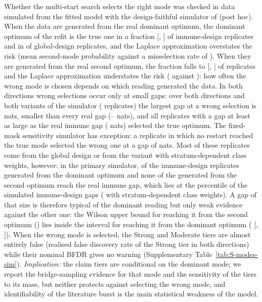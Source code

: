 Whether the multi-start search selects the right mode was checked in data simulated from the fitted model with the design-faithful simulator of  (post hoc).
When the data are generated from the real dominant optimum, the dominant optimum of the refit is the true one in a fraction \nSimPdomImm{} [\nSimPdomImmLo{}, \nSimPdomImmHi{}] of \nSimNImm{} immune-design replicates and in \nSimCorrectGlob{} of \nSimNGlob{} global-design replicates, and the Laplace approximation overstates the risk (mean second-mode probability \nSimLapFwd{} against a misselection rate of \nSimMissFwd{}).
When they are generated from the real second optimum, the fraction falls to \nSimPdomRev{} [\nSimPdomRevLo{}, \nSimPdomRevHi{}] of \nSimNRev{} replicates and the Laplace approximation understates the risk (\nSimLapRev{} against \nSimMissRev{}): how often the wrong mode is chosen depends on which reading generated the data.
In both directions wrong selections occur only at small gaps: over both directions and both variants of the simulator (\nSimNFaithful{} replicates) the largest gap at a wrong selection is \nSimWrongGapMax{} nats, smaller than every real gap (\nHbGapTisMin{}--\nHbGapGlob{} nats), and all \nSimNGeReal{} replicates with a gap at least as large as the real immune gap (\nHbGapImm{} nats) selected the true optimum. The fixed-mask sensitivity simulator has \nSimFixedWrongN{} exception: a replicate in which no restart reached the true mode selected the wrong one at a gap of \nSimFixedWrongGapMax{} nats.
Most of these replicates come from the global design or from the variant with stratum-dependent class weights, however: in the primary simulator, \nSimNGeRealImmCc{} of the \nSimNImm{} immune-design replicates generated from the dominant optimum and none of the \nSimNRev{} generated from the second optimum reach the real immune gap, which lies at the \nSimGapPctImm{} percentile of the simulated immune-design gaps (\nSimGapPctImmStrat{} with stratum-dependent class weights).
A gap of that size is therefore typical of the dominant reading but only weak evidence against the other one: the Wilson upper bound for reaching it from the second optimum (\nSimRevGeHi{}) lies inside the interval for reaching it from the dominant optimum (\nSimFwdGe{} [\nSimFwdGeLo{}, \nSimFwdGeHi{}]).
When the wrong mode is selected, the Strong and Moderate tiers are almost entirely false (realised false discovery rate of the Strong tier \nSimFdrWrong{} in both directions) while their nominal BFDR gives no warning (Supplementary Table~\ref{tab:S-modes-sim}).
\emph{Implication:} the claim tiers are conditional on the dominant mode; we report the bridge-sampling evidence for that mode and the sensitivity of the tiers to its mass, but neither protects against selecting the wrong mode, and identifiability of the literature burst is the main statistical weakness of the model.


